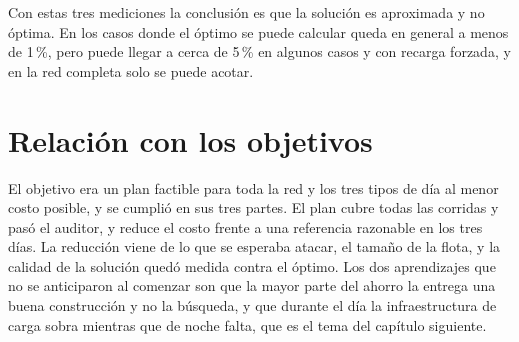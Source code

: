 Con estas tres mediciones la conclusión es que la solución es aproximada y no óptima. En los casos donde el óptimo se puede calcular queda en general a menos de 1\,\%, pero puede llegar a cerca de 5\,\% en algunos casos y con recarga forzada, y en la red completa solo se puede acotar.

\section{Relación con los objetivos}
\label{sec:relacion-objetivos}

El objetivo era un plan factible para toda la red y los tres tipos de día al menor costo posible, y se cumplió en sus tres partes. El plan cubre todas las corridas y pasó el auditor, y reduce el costo frente a una referencia razonable en los tres días. La reducción viene de lo que se esperaba atacar, el tamaño de la flota, y la calidad de la solución quedó medida contra el óptimo. Los dos aprendizajes que no se anticiparon al comenzar son que la mayor parte del ahorro la entrega una buena construcción y no la búsqueda, y que durante el día la infraestructura de carga sobra mientras que de noche falta, que es el tema del capítulo siguiente.
